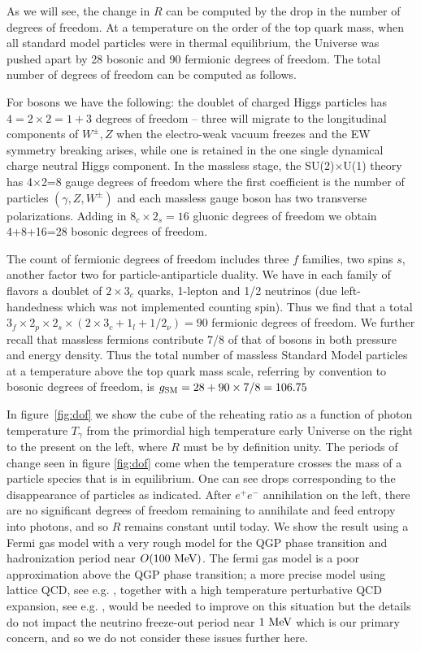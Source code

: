 As we will see, the change in $R$ can be computed by the drop in the number of degrees of freedom.  At a temperature on the order of the top quark mass, when all standard model particles were in thermal equilibrium, the Universe was pushed apart by 28 bosonic and 90 fermionic degrees of freedom. The total number of degrees of freedom can be computed as follows.  

For bosons we have the following: the doublet of charged Higgs particles has $4=2\times2=1+3$  degrees of freedom -- three will migrate to the longitudinal components of $W^\pm, Z$ when the electro-weak vacuum freezes and the EW symmetry breaking arises, while one is retained in the one single dynamical charge neutral Higgs component. In the massless stage, the SU(2)$\times$U(1) theory has 4$\times$2=8 gauge degrees of freedom where the first coefficient  is  the number of particles $(\gamma, Z, W^\pm)$ and each massless gauge boson has  two transverse polarizations. Adding in $8_c\times2_s=16$ gluonic degrees of freedom we obtain 4+8+16=28  bosonic degrees of freedom. 

The count of fermionic degrees of freedom includes three $f$ families, two spins $s$, another factor two for particle-antiparticle duality. We have in each family of flavors a doublet of $2\times 3_c$ quarks, 1-lepton and 1/2 neutrinos (due left-handedness which was not implemented counting spin). Thus we find that a total $3_f\times 2_p\times 2_s\times(2\times 3_c+1_l+1/2_\nu)=90$ fermionic degrees of freedom. We further recall that massless fermions contribute 7/8 of that of bosons in both pressure and energy density. Thus the total number of massless Standard Model particles at a temperature above the top quark mass scale, referring by convention to bosonic degrees of freedom, is $g_{\rm SM}=28+90\times 7/8=106.75$ 



In figure~\ref{fig:dof}  we show the cube of the reheating ratio  as a function of photon temperature $T_\gamma$ from the primordial high temperature  early Universe on the right to the present on the left, where $R$  must be by definition unity.  The periods of change seen in figure \ref{fig:dof} come when the temperature crosses the mass of a particle species that is in equilibrium. One can see drops corresponding to the disappearance of particles as indicated.   After $e^+e^-$ annihilation on the left, there are no significant degrees of freedom remaining to annihilate and feed entropy into photons, and so $R$  remains constant until today. We show the result using a Fermi gas model with a very rough model for the QGP phase transition and hadronization period near $O(100\text{ MeV})$. The fermi gas model is a poor approximation above the QGP phase transition; a more precise model using lattice QCD, see e.g. \cite{Borsanyi:2013bia}, together with a high temperature perturbative QCD expansion, see e.g. \cite{letessier2002hadrons}, would be needed to improve on this situation but the details do not impact the neutrino freeze-out period near $1\text{ MeV}$ which is our primary concern, and so we do not consider these issues further here.

